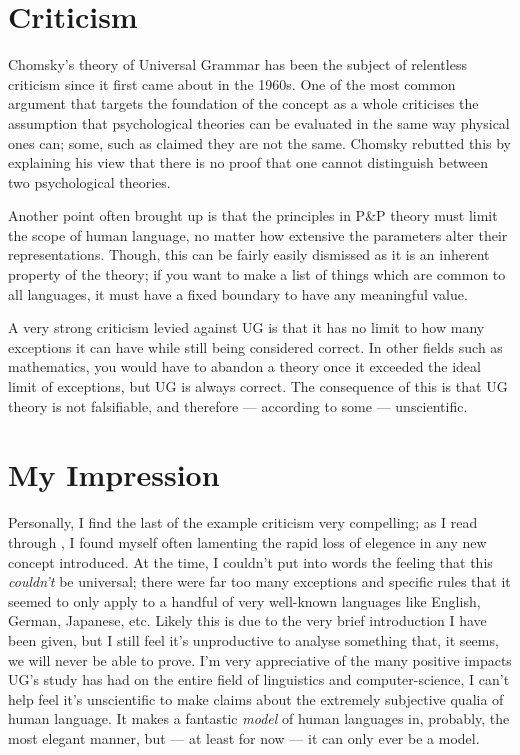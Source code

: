 \documentclass[a4paper,10pt]{article}
\begin{document}
\section{Criticism}
Chomsky's theory of Universal Grammar has been the subject of relentless criticism since it first
came about in the 1960s. One of the most common argument that targets the foundation of the concept
as a whole criticises the assumption that psychological theories can be evaluated in the same way
physical ones can; some, such as \citet{Quine60} claimed they are not the same. Chomsky rebutted this
by explaining his view that there is no proof that one cannot distinguish between two psychological
theories. \citep[p.~13]{Cipriani15}

Another point often brought up is that the principles in P\&P theory must limit the scope of
human language, no matter how extensive the parameters alter their representations. Though, this
can be fairly easily dismissed as it is an inherent property of the theory; if you want to make
a list of things which are common to all languages, it must have a fixed boundary to have any
meaningful value. \citep[p.~13]{Cipriani15}

A very strong criticism levied against UG is that it has no limit to how many exceptions it can have
while still being considered correct. In other fields such as mathematics, you would have to abandon
a theory once it exceeded the ideal limit of exceptions, but UG is always correct. The consequence
of this is that UG theory is not falsifiable, and therefore --- according to some --- unscientific.
\citep[p.~14]{Cipriani15}


\section{My Impression}
Personally, I find the last of the example criticism very compelling; as I read through \citet{ChUGAI},
I found myself often lamenting the rapid loss of elegence in any new concept introduced. At the time,
I couldn't put into words the feeling that this \emph{couldn't} be universal; there were far too many
exceptions and specific rules that it seemed to only apply to a handful of very well-known languages
like English, German, Japanese, etc. Likely this is due to the very brief introduction I have been
given, but I still feel it's unproductive to analyse something that, it seems, we will never be able
to prove. I'm very appreciative of the many positive impacts UG's study has had on the entire field of
linguistics and computer-science, I can't help feel it's unscientific to make claims about the extremely
subjective qualia of human language. It makes a fantastic \emph{model} of human languages in, probably,
the most elegant manner, but --- at least for now --- it can only ever be a model.
\end{document}

